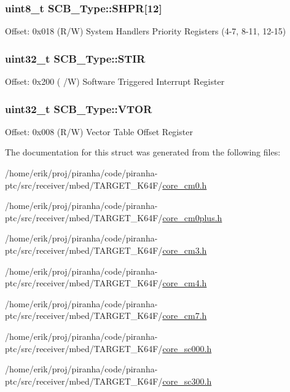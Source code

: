\subsubsection[{\texorpdfstring{S\+H\+PR}{SHPR}}]{ uint8\+\_\+t S\+C\+B\+\_\+\+Type\+::\+S\+H\+PR\mbox{[}12\mbox{]}}\hypertarget{structSCB__Type_a22b183a9b52ba369209bdb98569b174b}{}\label{structSCB__Type_a22b183a9b52ba369209bdb98569b174b}
Offset\+: 0x018 (R/W) System Handlers Priority Registers (4-\/7, 8-\/11, 12-\/15) 
\subsubsection[{\texorpdfstring{S\+T\+IR}{STIR}}]{ uint32\+\_\+t S\+C\+B\+\_\+\+Type\+::\+S\+T\+IR}\hypertarget{structSCB__Type_afd8149e3b084e2170607dbe64e27b766}{}\label{structSCB__Type_afd8149e3b084e2170607dbe64e27b766}
Offset\+: 0x200 ( /W) Software Triggered Interrupt Register 
\subsubsection[{\texorpdfstring{V\+T\+OR}{VTOR}}]{ uint32\+\_\+t S\+C\+B\+\_\+\+Type\+::\+V\+T\+OR}\hypertarget{structSCB__Type_a0faf96f964931cadfb71cfa54e051f6f}{}\label{structSCB__Type_a0faf96f964931cadfb71cfa54e051f6f}
Offset\+: 0x008 (R/W) Vector Table Offset Register 

The documentation for this struct was generated from the following files\+:\begin{DoxyCompactItemize}
\item 
/home/erik/proj/piranha/code/piranha-\/ptc/src/receiver/mbed/\+T\+A\+R\+G\+E\+T\+\_\+\+K64\+F/\hyperlink{core__cm0_8h}{core\+\_\+cm0.\+h}\item 
/home/erik/proj/piranha/code/piranha-\/ptc/src/receiver/mbed/\+T\+A\+R\+G\+E\+T\+\_\+\+K64\+F/\hyperlink{core__cm0plus_8h}{core\+\_\+cm0plus.\+h}\item 
/home/erik/proj/piranha/code/piranha-\/ptc/src/receiver/mbed/\+T\+A\+R\+G\+E\+T\+\_\+\+K64\+F/\hyperlink{core__cm3_8h}{core\+\_\+cm3.\+h}\item 
/home/erik/proj/piranha/code/piranha-\/ptc/src/receiver/mbed/\+T\+A\+R\+G\+E\+T\+\_\+\+K64\+F/\hyperlink{core__cm4_8h}{core\+\_\+cm4.\+h}\item 
/home/erik/proj/piranha/code/piranha-\/ptc/src/receiver/mbed/\+T\+A\+R\+G\+E\+T\+\_\+\+K64\+F/\hyperlink{core__cm7_8h}{core\+\_\+cm7.\+h}\item 
/home/erik/proj/piranha/code/piranha-\/ptc/src/receiver/mbed/\+T\+A\+R\+G\+E\+T\+\_\+\+K64\+F/\hyperlink{core__sc000_8h}{core\+\_\+sc000.\+h}\item 
/home/erik/proj/piranha/code/piranha-\/ptc/src/receiver/mbed/\+T\+A\+R\+G\+E\+T\+\_\+\+K64\+F/\hyperlink{core__sc300_8h}{core\+\_\+sc300.\+h}\end{DoxyCompactItemize}
